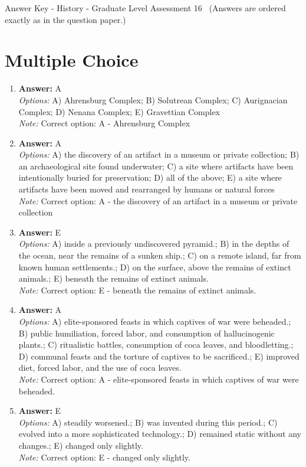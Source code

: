\documentclass[12pt]{article}
\begin{document}
\begin{center}
Answer Key - History - Graduate Level Assessment 16 \
\small (Answers are ordered exactly as in the question paper.)
\end{center}

\section*{Multiple Choice}
\begin{enumerate}[label=\arabic*.]
\item \textbf{Answer:} A
\\ \textit{Options:} A) Ahrensburg Complex; B) Solutrean Complex; C) Aurignacian Complex; D) Nenana Complex; E) Gravettian Complex
\\ \textit{Note:} Correct option: A - Ahrensburg Complex
\item \textbf{Answer:} A
\\ \textit{Options:} A) the discovery of an artifact in a museum or private collection; B) an archaeological site found underwater; C) a site where artifacts have been intentionally buried for preservation; D) all of the above; E) a site where artifacts have been moved and rearranged by humans or natural forces
\\ \textit{Note:} Correct option: A - the discovery of an artifact in a museum or private collection
\item \textbf{Answer:} E
\\ \textit{Options:} A) inside a previously undiscovered pyramid.; B) in the depths of the ocean, near the remains of a sunken ship.; C) on a remote island, far from known human settlements.; D) on the surface, above the remains of extinct animals.; E) beneath the remains of extinct animals.
\\ \textit{Note:} Correct option: E - beneath the remains of extinct animals.
\item \textbf{Answer:} A
\\ \textit{Options:} A) elite-sponsored feasts in which captives of war were beheaded.; B) public humiliation, forced labor, and consumption of hallucinogenic plants.; C) ritualistic battles, consumption of coca leaves, and bloodletting.; D) communal feasts and the torture of captives to be sacrificed.; E) improved diet, forced labor, and the use of coca leaves.
\\ \textit{Note:} Correct option: A - elite-sponsored feasts in which captives of war were beheaded.
\item \textbf{Answer:} E
\\ \textit{Options:} A) steadily worsened.; B) was invented during this period.; C) evolved into a more sophisticated technology.; D) remained static without any changes.; E) changed only slightly.
\\ \textit{Note:} Correct option: E - changed only slightly.
\end{enumerate}
\end{document}
